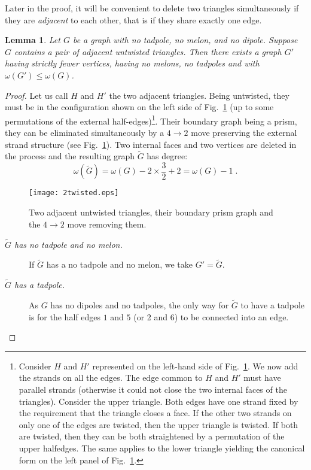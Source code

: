 \documentclass[10pt]{article}
\theoremstyle{plain}
\newtheorem{lemma}{Lemma}
\theoremstyle{definition}
\newcommand{\be}{\begin{equation}}
\newcommand{\ee}{\end{equation}}
\begin{document}
Later in the proof, it will be convenient to delete two triangles simultaneously if they are \emph{adjacent} to each other, that is if they share exactly one edge.  
\begin{lemma}\label{lem:4to2}
Let $G$ be a graph with no tadpole, no melon, and no dipole. Suppose $G$ contains a pair of adjacent untwisted triangles. Then there exists a  graph $G'$ having strictly fewer vertices, having no melons, no tadpoles and with $\omega(G') \le \omega(G)$.
\end{lemma}
\begin{proof}
Let us call $H$ and $H'$ the two adjacent triangles. Being untwisted, they must be in the configuration 
shown on the left side of Fig.~\ref{fig:2twisted} (up to some permutations of the external half-edges)\footnote{Consider $H$ and $H'$ represented on the left-hand side of Fig.~\ref{fig:2twisted}. 
We now add the strands on all the edges.
The edge common to $H$ and $H'$ must have parallel strands (otherwise it could not close the two internal faces of the triangles).
Consider the upper triangle. Both edges have one strand fixed by the requirement that the triangle closes a face. If the other two 
strands on only one of the edges are twisted, then the upper triangle is twisted. If both are twisted, then they can be both straightened by a 
permutation of the upper halfedges. The same applies to the lower triangle yielding the canonical form on the left panel of Fig.~\ref{fig:2twisted}.}. 
Their boundary graph being a prism, they can be
eliminated simultaneously by a $4\to 2$ move preserving the external strand structure (see Fig.~\ref{fig:2twisted}). Two internal
faces and two vertices are deleted in the process and the resulting graph $\tilde{G}$ has degree:
\be
\omega(\tilde{G}) = \omega(G) - 2 \times \frac{3}{2} + 2 = \omega(G) - 1\;.
\ee
\begin{figure}[htb]
 \begin{center}
 \texttt{[image: 2twisted.eps]}  
 \caption{Two adjacent untwisted triangles, their boundary prism graph and the $4 \to 2$ move removing them.} \label{fig:2twisted}
 \end{center}
 \end{figure}
\begin{description}
\item[\it $\tilde G$ has no tadpole and no melon.] If $\tilde{G}$ has a no tadpole and no melon, we take $G' = \tilde{G}$. 
\item[\it $\tilde G$ has a tadpole.] As $G$ has no dipoles and no tadpoles, the only way for $\tilde G$ to have a tadpole is for the half edges $1$ and $5$ (or 2 and 6) to be connected into an edge.

\end{description}
\end{proof}
\end{document}
